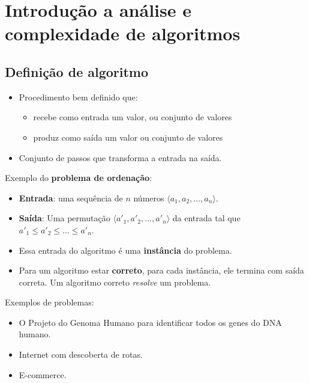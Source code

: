 \chapter{Introdução a análise e complexidade de algoritmos}

\section{Definição de algoritmo}

\begin{itemize}
\item Procedimento bem definido que:
	\begin{itemize}
	\item recebe como entrada um valor, ou conjunto de valores
	\item produz como saída um valor ou conjunto de valores
	\end{itemize}
\item Conjunto de passos que transforma a entrada na saída.
\end{itemize}

Exemplo do {\bf problema de ordenação}:
\begin{itemize}
\item {\bf Entrada}: uma sequência de $n$ números $\langle a_1, a_2, ..., a_n \rangle$.

\item {\bf Saída}:  Uma permutação $\langle {a'}_1, {a'}_2, ..., {a'}_n \rangle$ da
entrada tal que ${a'}_1 \leq {a'}_2 \leq ... \leq {a'}_n$.
\end{itemize}

\begin{itemize}
\item Essa entrada do algoritmo é uma {\bf instância} do problema.
\item Para um algoritmo estar {\bf correto}, para cada instância, ele termina com saída 
correta. Um algoritmo correto \textit{resolve} um problema. 
\end{itemize}

Exemplos de problemas:
\begin{itemize}
\item O Projeto do Genoma Humano para identificar todos os genes do DNA humano.
\item Internet com descoberta de rotas.
\item E-commerce.
\end{itemize}

